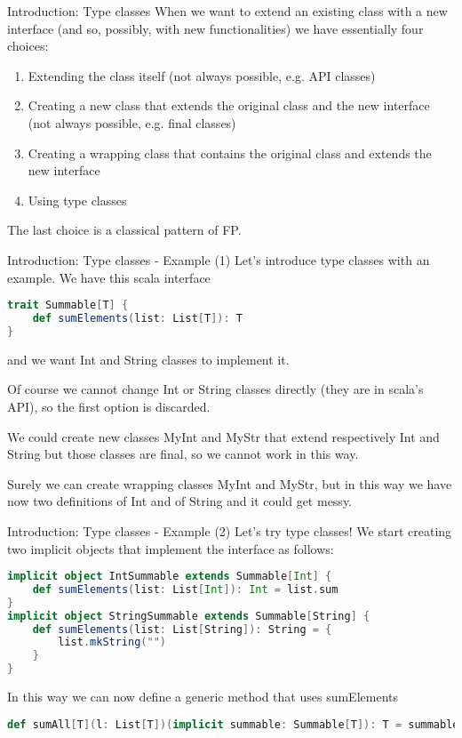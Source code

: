 \begin{frame}{Introduction: Type classes}
	When we want to extend an existing class with a new interface 
	(and so, possibly, with new functionalities) we have essentially four choices:	
	\begin{enumerate}[<+->]
		\item Extending the class itself (not always possible, e.g. API classes)
		\item Creating a new class that extends the original class and the new interface (not always possible, e.g. final classes)
		\item Creating a wrapping class that contains the original class and extends the new interface
		\item Using type classes
	\end{enumerate}
	\pause[4]
	The last choice is a classical pattern of FP.			
\end{frame}

\begin{frame}[fragile]{Introduction: Type classes - Example (1)}
	Let's introduce type classes with an example.
	We have this scala interface
\begin{lstlisting}[language=scala]
trait Summable[T] {
	def sumElements(list: List[T]): T
}
\end{lstlisting}
	and we want Int and String classes to implement it.

	\pause

	Of course we cannot change Int or String classes directly (they are in scala's API), so the first option is discarded.
	
	\pause
	
	We could create new classes MyInt and MyStr that extend respectively Int and String but those classes are final, so we cannot work in 
	this way.
	
	\pause
	
	Surely we can create wrapping classes MyInt and MyStr, but in this way we have now two definitions of Int and of String and 
	it could get messy.
\end{frame}

\begin{frame}[fragile]{Introduction: Type classes - Example (2)}	
	Let's try type classes!
	We start creating two implicit objects that implement the interface as follows:
\begin{lstlisting}[language=scala]
implicit object IntSummable extends Summable[Int] {
	def sumElements(list: List[Int]): Int = list.sum
}
implicit object StringSummable extends Summable[String] {
	def sumElements(list: List[String]): String = {
		list.mkString("")
	}
}
\end{lstlisting}

	\pause

	In this way we can now define a generic method that uses sumElements
\begin{lstlisting}[language=scala]
def sumAll[T](l: List[T])(implicit summable: Summable[T]): T = summable.sumElements(l)		
\end{lstlisting}	
\end{frame}

